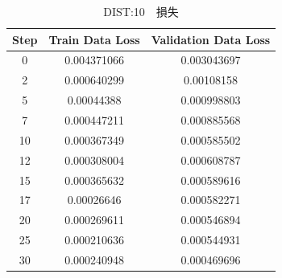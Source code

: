 \documentclass{jreport}		%
\begin{document}
\begin{table}
  \begin{center}
  \caption{DIST:10　損失}
  \begin{tabular}{c|cc} \hline
Step&Train Data Loss&Validation Data Loss \\ \hline
0&0.004371066&0.003043697 \\
2&0.000640299&0.00108158 \\
5&0.00044388&0.000998803 \\
7&0.000447211&0.000885568 \\
10&0.000367349&0.000585502 \\
12&0.000308004&0.000608787 \\
15&0.000365632&0.000589616 \\
17&0.00026646&0.000582271 \\
20&0.000269611&0.000546894 \\
25&0.000210636&0.000544931 \\
30&0.000240948&0.000469696 \\

\end{tabular}
\end{center}
\end{table}
\end{document}
